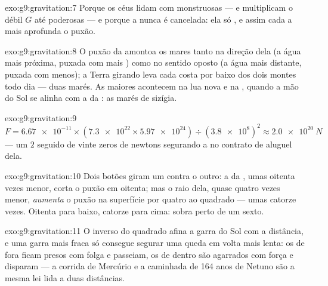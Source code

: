 \begin{solution}{exo:g9:gravitation:7}
Porque os céus lidam com  monstruosas ---  e 
multiplicam o débil $G$ até  poderosas --- e porque a 
nunca é cancelada: ela só , e assim cada  a mais aprofunda
o puxão.
\end{solution}

\begin{solution}{exo:g9:gravitation:8}
O puxão da  amontoa os mares tanto na direção dela (a água mais
próxima, puxada com mais ) como no sentido oposto (a água mais
distante, puxada com menos); a Terra girando leva cada costa por
baixo dos dois montes todo dia --- duas marés. As maiores acontecem na
lua nova e na , quando a mão do Sol se alinha com a da :
as marés de sizígia.
\end{solution}

\begin{solution}{exo:g9:gravitation:9}
$F = \num{6.67e-11} \times (\num{7.3e22} \times
\num{5.97e24}) \div (\num{3.8e8})^2 \approx \qty{2.0e20}{N}$ --- um
$2$ seguido de vinte zeros de newtons segurando a  no contrato de
aluguel dela.
\end{solution}

\begin{solution}{exo:g9:gravitation:10}
Dois botões giram um contra o outro: a  da , umas oitenta
vezes menor, corta o puxão em oitenta; mas o raio dela, quase quatro
vezes menor, \emph{aumenta} o puxão na superfície por quatro ao
quadrado --- umas catorze vezes. Oitenta para baixo, catorze para
cima: sobra perto de um sexto.
\end{solution}

\begin{solution}{exo:g9:gravitation:11}
O inverso do quadrado afina a garra do Sol com a distância, e uma
garra mais fraca só consegue segurar uma queda em volta mais lenta:
os  de fora ficam presos com folga e passeiam, os de dentro
são agarrados com força e disparam --- a corrida de Mercúrio e a
caminhada de 164 anos de Netuno são a mesma lei lida a duas
distâncias.
\end{solution}

